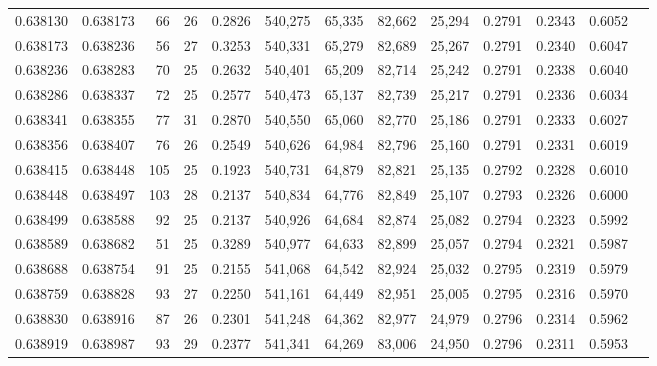 \begin{tabular}{rrrrrrrrrrrrr}
0.638130 & 0.638173 &  66 &  26 &                                     0.2826 & 540,275 &  65,335 &  82,662 &  25,294 & 0.2791 & 0.2343 & 0.6052 \\
0.638173 & 0.638236 &  56 &  27 &                                     0.3253 & 540,331 &  65,279 &  82,689 &  25,267 & 0.2791 & 0.2340 & 0.6047 \\
0.638236 & 0.638283 &  70 &  25 &                                     0.2632 & 540,401 &  65,209 &  82,714 &  25,242 & 0.2791 & 0.2338 & 0.6040 \\
0.638286 & 0.638337 &  72 &  25 &                                     0.2577 & 540,473 &  65,137 &  82,739 &  25,217 & 0.2791 & 0.2336 & 0.6034 \\
0.638341 & 0.638355 &  77 &  31 &                                     0.2870 & 540,550 &  65,060 &  82,770 &  25,186 & 0.2791 & 0.2333 & 0.6027 \\
0.638356 & 0.638407 &  76 &  26 &                                     0.2549 & 540,626 &  64,984 &  82,796 &  25,160 & 0.2791 & 0.2331 & 0.6019 \\
0.638415 & 0.638448 & 105 &  25 &                                     0.1923 & 540,731 &  64,879 &  82,821 &  25,135 & 0.2792 & 0.2328 & 0.6010 \\
0.638448 & 0.638497 & 103 &  28 &                                     0.2137 & 540,834 &  64,776 &  82,849 &  25,107 & 0.2793 & 0.2326 & 0.6000 \\
0.638499 & 0.638588 &  92 &  25 &                                     0.2137 & 540,926 &  64,684 &  82,874 &  25,082 & 0.2794 & 0.2323 & 0.5992 \\
0.638589 & 0.638682 &  51 &  25 &                                     0.3289 & 540,977 &  64,633 &  82,899 &  25,057 & 0.2794 & 0.2321 & 0.5987 \\
0.638688 & 0.638754 &  91 &  25 &                                     0.2155 & 541,068 &  64,542 &  82,924 &  25,032 & 0.2795 & 0.2319 & 0.5979 \\
0.638759 & 0.638828 &  93 &  27 &                                     0.2250 & 541,161 &  64,449 &  82,951 &  25,005 & 0.2795 & 0.2316 & 0.5970 \\
0.638830 & 0.638916 &  87 &  26 &                                     0.2301 & 541,248 &  64,362 &  82,977 &  24,979 & 0.2796 & 0.2314 & 0.5962 \\
0.638919 & 0.638987 &  93 &  29 &                                     0.2377 & 541,341 &  64,269 &  83,006 &  24,950 & 0.2796 & 0.2311 & 0.5953 \\

\end{tabular}
